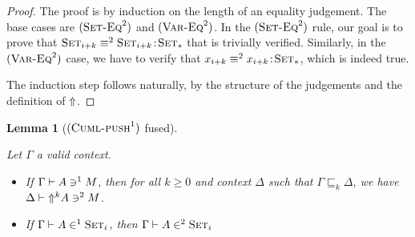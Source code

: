 \documentclass[preprint
              , authoryear
              , onecolumn
              ]{sigplanconf}
\newtheorem{lemma}{Lemma}
\newcommand{\ruleName}[2]{(\mathrm{\textsc{#1}}^{#2})}
\newcommand{\ruleSetEq}[1]{\ruleName{Set-Eq}{#1}}
\newcommand{\ruleVarEq}[1]{\ruleName{Var-Eq}{#1}}
\newcommand{\sublift}[3]{#2 \sqsubseteq_{#1} #3}
\begin{document}

\begin{proof}

The proof is by induction on the length of an equality judgement. The
base cases are $\ruleSetEq{2}$ and $\ruleVarEq{2}$. In the
$\ruleSetEq{2}$ rule, our goal is to prove that
$\equalN{\Set{i+k}}{\Set{i+k}}{2}{\SetTop}$ that is trivially
verified. Similarly, in the $\ruleVarEq{2}$ case, we have to verify
that $\equalN{x_{i+k}}{x_{i+k}}{2}{\SetTop}$, which is indeed true.

The induction step follows naturally, by the structure of the
judgements and the definition of $\SYMBUp$. 

\end{proof}



\begin{lemma}[$\ruleName{Cuml-push}{1}$ fused]
\label{lemma:cuml-push-fused}

Let $\Gamma$ a valid context.

\begin{itemize}
\item If \xspace$\Gamma \vdash \pushN{M}{1}{A}$, then for all $k \geq 0$ and
  context $\Delta$ such that $\sublift{k}{\Gamma}{\Delta}$, we have
  $\Delta \vdash \pushN{M}{2}{\Up{k}{A}}$.
\item If \xspace$\Gamma \vdash \pullN{A}{1}{\Set{i}}$, then $\Gamma \vdash
  \pullN{A}{2}{\Set{i}}$
\end{itemize}

\end{lemma}

\end{document}
